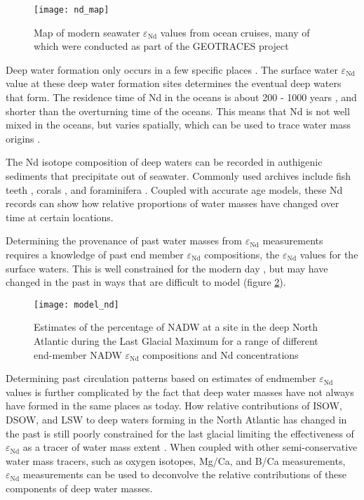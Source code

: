 \begin{figure}[h]
	\texttt{[image: nd\_map]}
	\centering
	\caption{Map of modern seawater $\varepsilon_\text{Nd}$ values from ocean cruises, many of which were conducted as part of the GEOTRACES project \citep{vandeflierdtNeodymiumOceansGlobal2016}}
	\label{fig:nd_map}
\end{figure}

Deep water formation only occurs in a few specific places \citep{gebbieHowOceanFilled2011}. The surface water $\varepsilon_\text{Nd}$ value at these deep water formation sites determines the eventual deep waters that form. The residence time of Nd in the oceans is about 200 - 1000 years \citep{tachikawaNewApproachNd1999}, and shorter than the overturning time of the oceans. This means that Nd is not well mixed in the oceans, but varies spatially, which can be used to trace water mass origins \citep{bizimisNeodymiumIsotopes2016}. 

The Nd isotope composition of deep waters can be recorded in authigenic sediments that precipitate out of seawater. Commonly used archives include fish teeth \citep{osborneSeawaterNeodymiumLead2014}, corals \citep{vandeflierdtTemporalStabilityNeodymium2006}, and foraminifera \citep{tachikawaNeodymiumAssociatedForaminiferal2014}. Coupled with accurate age models, these Nd records can show how relative proportions of water masses have changed over time at certain locations.

Determining the provenance of past water masses from $\varepsilon_\text{Nd}$ measurements requires a knowledge of past end member $\varepsilon_\text{Nd}$ compositions, the $\varepsilon_\text{Nd}$ values for the surface waters. This is well constrained for the modern day \citep{vandeflierdtNeodymiumOceansGlobal2016}, but may have changed in the past in ways that are difficult to model (figure \ref{fig:model_nd}).

\begin{figure}[h]
	\texttt{[image: model\_nd]}
	\centering
	\caption{Estimates of the percentage of NADW at a site in the deep North Atlantic during the Last Glacial Maximum for a range of different end-member NADW $\varepsilon_\text{Nd}$ compositions and Nd concentrations \citep{howeNorthAtlanticDeep2016}}
	\label{fig:model_nd}
\end{figure}

Determining past circulation patterns based on estimates of endmember $\varepsilon_\text{Nd}$ values is further complicated by the fact that deep water masses have not always have formed in the same places as today. How relative contributions of ISOW, DSOW, and LSW to deep waters forming in the North Atlantic has changed in the past is still poorly constrained for the last glacial limiting the effectiveness of $\varepsilon_\text{Nd}$ as a tracer of water mass extent \citep{dokkenRapidChangesMechanism1999, hillaire-marcelAbsenceDeepwaterFormation2001, crocketPersistentNordicDeepwater2011, larkinActiveNordicSeas2022}. When coupled with other semi-conservative water mass tracers, such as oxygen isotopes, Mg/Ca, and B/Ca measurements, $\varepsilon_\text{Nd}$ measurements can be used to deconvolve the relative contributions of these components of deep water masses. 

